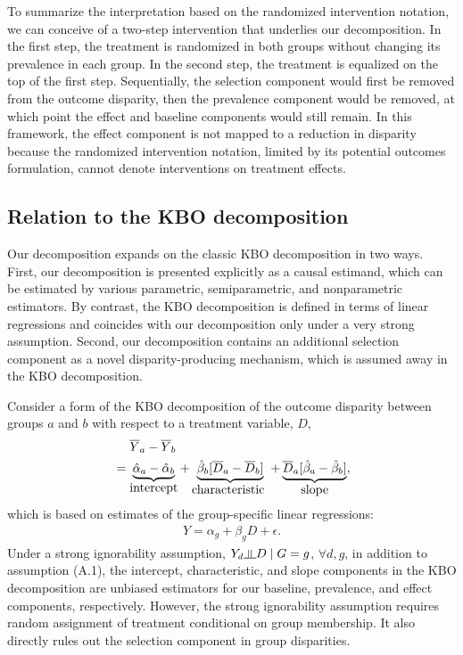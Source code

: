 \documentclass[12pt,a4paper]{article}
\newcommand{\indep}{\rotatebox[origin=c]{90}{$\models$}}  %
\begin{document}
To summarize the interpretation based on the randomized intervention notation, we can conceive of a two-step intervention that underlies our decomposition. In the first step, the treatment is randomized in both groups without changing its prevalence in each group. In the second step, the treatment is equalized on the top of the first step. Sequentially, the selection component would first be removed from the outcome disparity, then the prevalence component would be removed, at which point the effect and baseline components would still remain. In this framework, the effect component is not mapped to a reduction in disparity because the randomized intervention notation, limited by its potential outcomes formulation, cannot denote interventions on treatment effects.

\subsection{Relation to the KBO decomposition}
Our decomposition expands on the classic KBO decomposition in two ways. First, our decomposition is presented explicitly as a causal estimand, which can be estimated by various parametric, semiparametric, and nonparametric estimators. 
By contrast, the KBO decomposition is defined in terms of linear regressions and coincides with our decomposition only under a very strong assumption. Second, our decomposition contains an additional selection component as a novel disparity-producing mechanism, which is assumed away in the KBO decomposition. 

Consider a form of the KBO decomposition of the outcome disparity between groups $a$ and $b$ with respect to a treatment variable, $D$, 
\begin{align*}
&\phantom{{}={}} \overline{Y}_a-\overline{Y}_b   \nonumber  \\
&= \underbrace{ \hat{\alpha}_a-\hat{\alpha}_b }_{\text{\normalsize intercept}}
+ \underbrace{\hat{\beta}_b [\overline{D}_a-\overline{D}_b]}_{\text{\normalsize characteristic }}
+ \underbrace{\overline{D}_a[ \hat{\beta}_a - \hat{\beta}_b ]}_{\text{\normalsize slope}},
\end{align*}
which is based on estimates of the group-specific linear regressions:
\begin{gather*}
Y=\alpha_g+\beta_g D + \epsilon.
\end{gather*}
Under a strong ignorability assumption, $Y_d \indep D \mid  G=g$, $\forall d, g$, in addition to assumption (A.1), the intercept, characteristic, and slope components in the KBO decomposition are unbiased estimators for our baseline, prevalence, and effect components, respectively. However, the strong ignorability assumption requires random assignment of treatment conditional on group membership. It also directly rules out the selection component in group disparities.
\end{document}
